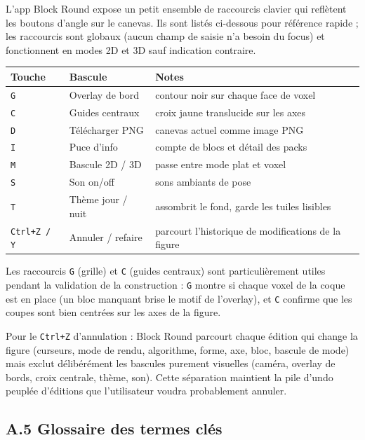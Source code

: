 \documentclass[12pt,a4paper]{scrartcl}
\newcommand{\code}[1]{\texttt{\small #1}}
\begin{document}
L'app Block Round expose un petit ensemble de raccourcis clavier qui reflètent les boutons d'angle sur le canevas. Ils sont listés ci-dessous pour référence rapide ; les raccourcis sont globaux (aucun champ de saisie n'a besoin du focus) et fonctionnent en modes 2D et 3D sauf indication contraire.

\vspace{0.4em}
\begin{center}
\begin{tabular}{@{}lll@{}}
\toprule
\textbf{Touche} & \textbf{Bascule} & \textbf{Notes} \\
\midrule
\code{G} & Overlay de bord  & contour noir sur chaque face de voxel \\
\code{C} & Guides centraux  & croix jaune translucide sur les axes \\
\code{D} & Télécharger PNG  & canevas actuel comme image PNG \\
\code{I} & Puce d'info  & compte de blocs et détail des packs \\
\code{M} & Bascule 2D / 3D  & passe entre mode plat et voxel \\
\code{S} & Son on/off  & sons ambiants de pose \\
\code{T} & Thème jour / nuit  & assombrit le fond, garde les tuiles lisibles \\
\code{Ctrl+Z / Y} & Annuler / refaire  & parcourt l'historique de modifications de la figure \\
\bottomrule
\end{tabular}
\end{center}

Les raccourcis \code{G} (grille) et \code{C} (guides centraux) sont particulièrement utiles pendant la validation de la construction : \code{G} montre si chaque voxel de la coque est en place (un bloc manquant brise le motif de l'overlay), et \code{C} confirme que les coupes sont bien centrées sur les axes de la figure.

Pour le \code{Ctrl+Z} d'annulation : Block Round parcourt chaque édition qui change la figure (curseurs, mode de rendu, algorithme, forme, axe, bloc, bascule de mode) mais exclut délibérément les bascules purement visuelles (caméra, overlay de bords, croix centrale, thème, son). Cette séparation maintient la pile d'undo peuplée d'éditions que l'utilisateur voudra probablement annuler.

\subsection*{A.5 Glossaire des termes clés}
\end{document}
